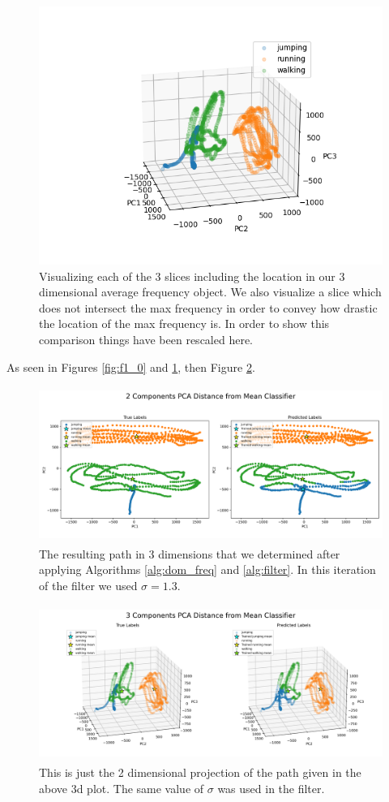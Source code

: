 \documentclass[11pt]{amsart}
\begin{document}
\begin{figure}[h]
	\centering
	\includegraphics[width=.5\textwidth]{../visualizations/pca_3_components_plot.png}
 	\caption{Visualizing each of the 3 slices including the location in our 3 dimensional average frequency object. We also visualize a slice which does not intersect the max frequency in order to convey how drastic the location of the max frequency is. In order to show this comparison things have been rescaled here.}\label{fig:f1}
\end{figure}


As seen in Figures \ref{fig:f1_0} and \ref{fig:f1}, then Figure \ref{fig:f2}.

\begin{figure}[h]
	\centering
	\includegraphics[height=2in]{../visualizations/pca_distance_from_mean_classifier_2d.png}
 	\caption{The resulting path in 3 dimensions that we determined after applying Algorithms \ref{alg:dom_freq} and \ref{alg:filter}. In this iteration of the filter we used $\sigma=1.3$.}\label{fig:f2}
\end{figure}

\begin{figure}[h]
	\centering
	\includegraphics[height=2in]{../visualizations/pca_distance_from_mean_classifier_3d.png}
 	\caption{This is just the 2 dimensional projection of the path given in the above 3d plot. The same value of $\sigma$ was used in the filter.}\label{fig:f3}
\end{figure}
\end{document}
